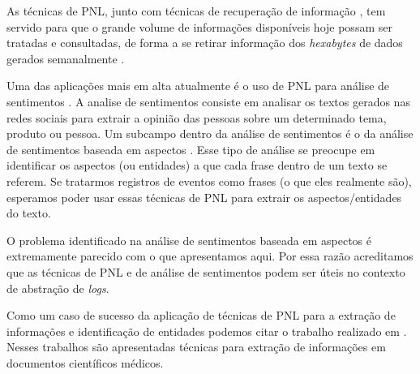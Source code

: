 \documentclass[
	12pt,				%
	openright,			%
	twoside,			%
	a4paper,			%
	english,			%
	spanish,			%
	brazil,				%
	]{abntex2}
\begin{document}
As técnicas de PNL, junto com técnicas de recuperação de informação \cite{manning2008introduction}, tem servido para que o grande volume de informações disponíveis hoje possam ser tratadas e consultadas, de forma a se retirar informação dos \emph{hexabytes} de dados gerados semanalmente \cite{cambria2014jumping}.


Uma das aplicações mais em alta atualmente é o uso de PNL para análise de sentimentos \cite{feldman2013techniques}. A analise de sentimentos consiste em analisar os textos gerados nas redes sociais para extrair a opinião das pessoas sobre um determinado tema, produto ou pessoa. Um subcampo dentro da análise de sentimentos é o da análise de sentimentos baseada em aspectos \cite{feldman2013techniques}. Esse tipo de análise se preocupe em identificar os aspectos (ou entidades) a que cada frase dentro de um texto se referem. Se tratarmos registros de eventos como frases (o que eles realmente são), esperamos poder usar essas técnicas de PNL para extrair os aspectos/entidades do texto.

O problema identificado na análise de sentimentos baseada em aspectos é extremamente parecido com o que apresentamos aqui. Por essa razão acreditamos que as técnicas de PNL e de análise de sentimentos podem ser úteis no contexto de abstração de \emph{logs}.


Como um caso de sucesso da aplicação de técnicas de PNL para a extração de informações e identificação de entidades podemos citar o trabalho realizado em \cite{matos2010environment, duque2012processo}. Nesses trabalhos são apresentadas técnicas para extração de informações em documentos científicos médicos.


\end{document}
